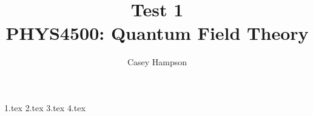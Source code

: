 \documentclass[titlepage]{article}
\title{Test 1 \\[5pt] PHYS4500: Quantum Field Theory}
\author{Casey Hampson}
\begin{document}
    \maketitle
    \pagebreak

    {1.tex}
    {2.tex}
    {3.tex}
    {4.tex}
\end{document}
